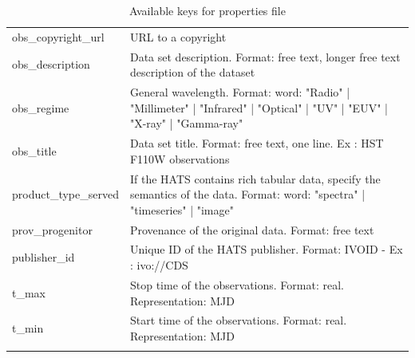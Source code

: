 \documentclass[11pt,a4paper]{ivoa}
\begin{document}
{\begin{longtable}[h!]{p{} p{}}
obs\_copyright\_url &URL to a copyright  \\
obs\_description &Data set description. Format: free text, longer free text description of the dataset \\
obs\_regime &General wavelength. Format: word: "Radio" | "Millimeter" | "Infrared" | "Optical" | "UV" | "EUV" | "X-ray" | "Gamma-ray" \\
obs\_title &Data set title. Format: free text, one line. Ex : HST F110W observations \\
product\_type\_served &If the HATS contains rich tabular data, specify the semantics of the data. Format: word:  "spectra" | "timeseries" | "image" \\
prov\_progenitor &Provenance of the original data. Format: free text \\
publisher\_id &Unique ID of the HATS publisher. Format: IVOID - Ex : ivo://CDS \\
t\_max &Stop time of the observations. Format: real. Representation: MJD \\
t\_min &Start time of the observations. Format: real. Representation: MJD \\
\sptablerule    
\caption{Available keys for properties file}
\label{tab:properties}
\end{longtable}}
\end{document}
